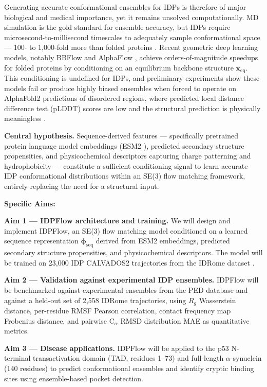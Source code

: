 \documentclass[12pt]{article}
\begin{document}
Generating accurate conformational ensembles for IDPs is therefore of major biological and
medical importance, yet it remains unsolved computationally.
MD simulation is the gold standard for ensemble accuracy, but IDPs require microsecond-to-millisecond
timescales to adequately sample conformational space --- 100- to 1,000-fold more than folded
proteins \cite{mittag2007idp_nmr}.
Recent geometric deep learning models, notably BBFlow \cite{wolf2025bbflow} and
AlphaFlow \cite{jing2024alphaflow}, achieve orders-of-magnitude speedups for folded proteins
by conditioning on an equilibrium backbone structure $\mathbf{x}_\mathrm{eq}$.
This conditioning is undefined for IDPs, and preliminary experiments show these models fail
or produce highly biased ensembles when forced to operate on AlphaFold2 predictions of
disordered regions, where predicted local distance difference test (pLDDT) scores are low
and the structural prediction is physically meaningless \cite{ruff2021af2idp}.

\noindent\textbf{Central hypothesis.}
Sequence-derived features --- specifically pretrained protein language model embeddings (ESM2
\cite{lin2023esm2}), predicted secondary structure propensities, and physicochemical
descriptors capturing charge patterning and hydrophobicity --- constitute a sufficient
conditioning signal to learn accurate IDP conformational distributions within an SE(3) flow
matching framework, entirely replacing the need for a structural input.

\noindent\textbf{Specific Aims:}

\noindent\textbf{Aim 1 --- IDPFlow architecture and training.}
We will design and implement IDPFlow, an SE(3) flow matching model conditioned on a
learned sequence representation $\boldsymbol{\phi}_\mathrm{seq}$ derived from ESM2
embeddings, predicted secondary structure propensities, and physicochemical descriptors.
The model will be trained on 23,000 IDP CALVADOS2 trajectories from the IDRome dataset
\cite{tesei2024idrome}.

\noindent\textbf{Aim 2 --- Validation against experimental IDP ensembles.}
IDPFlow will be benchmarked against experimental ensembles from the PED database
\cite{lazar2021ped} and against a held-out set of 2,558 IDRome trajectories, using
$R_g$ Wasserstein distance, per-residue RMSF Pearson correlation, contact frequency map
Frobenius distance, and pairwise C$_\alpha$ RMSD distribution MAE as quantitative metrics.

\noindent\textbf{Aim 3 --- Disease applications.}
IDPFlow will be applied to the p53 N-terminal transactivation domain (TAD, residues 1--73)
and full-length $\alpha$-synuclein (140 residues) to predict conformational ensembles and
identify cryptic binding sites using ensemble-based pocket detection.
\end{document}
